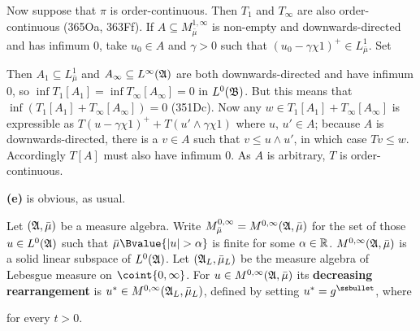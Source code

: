 {Now suppose that $\pi$ is order-continuous.   Then $T_1$ and
$T_{\infty}$ are also order-continuous (365Oa, 363Ff).   If 
$A\subseteq M^{1,\infty}_{\bar\mu}$ is non-empty and downwards-directed 
and has infimum $0$, take $u_0\in A$
and $\gamma>0$ such that $(u_0-\gamma\chi 1)^+\in L^1_{\bar\mu}$.   Set
     
     
\noindent Then $A_1\subseteq L^1_{\bar\mu}$ and $A_{\infty}\subseteq
L^{\infty}(\frak A)$ are both downwards-directed and have infimum $0$,
so $\inf T_1[A_1]=\inf T_{\infty}[A_{\infty}]=0$ in $L^0(\frak B)$.
But this means that $\inf(T_1[A_1]+T_{\infty}[A_{\infty}])=0$ (351Dc).
Now any $w\in
T_1[A_1]+T_{\infty}[A_{\infty}]$ is expressible as $T(u-\gamma\chi
1)^++T(u'\wedge\gamma\chi 1)$ where $u$, $u'\in A$;  because $A$ is
downwards-directed, there is a $v\in A$ such that $v\le u\wedge u'$, in
which case $Tv\le w$.   Accordingly $T[A]$ must also have infimum $0$.
As $A$ is arbitrary, $T$ is order-continuous.
     
\medskip
     
{\bf (e)} is obvious, as usual.
}%
     
  Let
$(\frak A,\bar\mu)$ be a measure algebra.   Write
$M^{0,\infty}_{\bar\mu}=M^{0,\infty}(\frak A,\bar\mu)$ for the set of
those $u\in L^0(\frak A)$ such that
$\bar\mu\Bvalue{|u|>\alpha}$ is finite for some $\alpha\in\Bbb R$.
    $M^{0,\infty}(\frak A,\bar\mu)$ is a solid linear
subspace of $L^0(\frak A)$.   Let $(\frak A_L,\bar\mu_L)$ be the measure
algebra of Lebesgue measure on $\coint{0,\infty}$.   For
$u\in M^{0,\infty}(\frak A,\bar\mu)$ its {\bf decreasing rearrangement} is
$u^*\in M^{0,\infty}(\frak A_L,\bar\mu_L)$, defined by setting
$u^*=g^{\ssbullet}$, where
     
     
\noindent for every $t>0$.   
     
     
